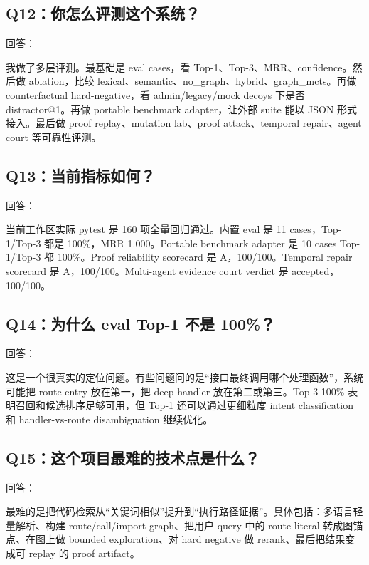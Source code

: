 \documentclass[UTF8,12pt,openany]{ctexbook}
\begin{document}
\subsection{Q12：你怎么评测这个系统？}

回答：\par

我做了多层评测。最基础是 eval cases，看 Top-1、Top-3、MRR、confidence。然后做 ablation，比较 lexical、semantic、no\_graph、hybrid、graph\_mcts。再做 counterfactual hard-negative，看 admin/legacy/mock decoys 下是否 distractor@1。再做 portable benchmark adapter，让外部 suite 能以 JSON 形式接入。最后做 proof replay、mutation lab、proof attack、temporal repair、agent court 等可靠性评测。\par

\subsection{Q13：当前指标如何？}

回答：\par

当前工作区实际 pytest 是 160 项全量回归通过。内置 eval 是 11 cases，Top-1/Top-3 都是 100\%，MRR 1.000。Portable benchmark adapter 是 10 cases Top-1/Top-3 都 100\%。Proof reliability scorecard 是 A，100/100。Temporal repair scorecard 是 A，100/100。Multi-agent evidence court verdict 是 accepted，100/100。\par

\subsection{Q14：为什么 eval Top-1 不是 100\%？}

回答：\par

这是一个很真实的定位问题。有些问题问的是“接口最终调用哪个处理函数”，系统可能把 route entry 放在第一，把 deep handler 放在第二或第三。Top-3 100\% 表明召回和候选排序足够可用，但 Top-1 还可以通过更细粒度 intent classification 和 handler-vs-route disambiguation 继续优化。\par

\subsection{Q15：这个项目最难的技术点是什么？}

回答：\par

最难的是把代码检索从“关键词相似”提升到“执行路径证据”。具体包括：多语言轻量解析、构建 route/call/import graph、把用户 query 中的 route literal 转成图锚点、在图上做 bounded exploration、对 hard negative 做 rerank、最后把结果变成可 replay 的 proof artifact。\par
\end{document}
